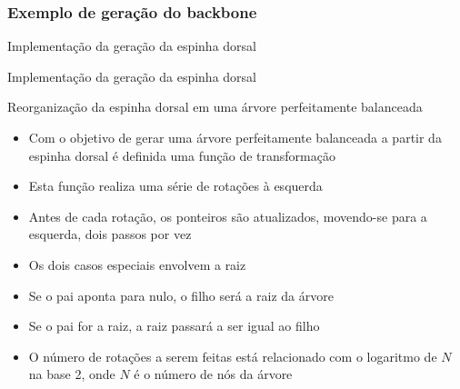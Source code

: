 \begin{frame}
\frametitle{Exemplo de geração do backbone}


\end{frame}

\begin{frame}[fragile]{Implementação da geração da espinha dorsal}
\end{frame}

\begin{frame}[fragile]{Implementação da geração da espinha dorsal}
\end{frame}

\begin{frame}[fragile]{Reorganização da espinha dorsal em uma árvore perfeitamente balanceada}

    \begin{itemize}
        \item Com o objetivo de gerar uma árvore perfeitamente balanceada a partir da espinha
            dorsal é definida uma função de transformação

        \item Esta função realiza uma série de rotações à esquerda

        \item Antes de cada rotação, os ponteiros  são atualizados, movendo-se
            para a esquerda, dois passos por vez

        \item Os dois casos especiais envolvem a raiz

        \item Se o pai aponta para nulo, o filho será a raiz da árvore

        \item Se o pai for a raiz, a raiz passará a ser igual ao filho

        \item O número de rotações a serem feitas está relacionado com o logaritmo de $N$ na 
            base 2, onde $N$ é o número de nós da árvore
    \end{itemize}

\end{frame}


